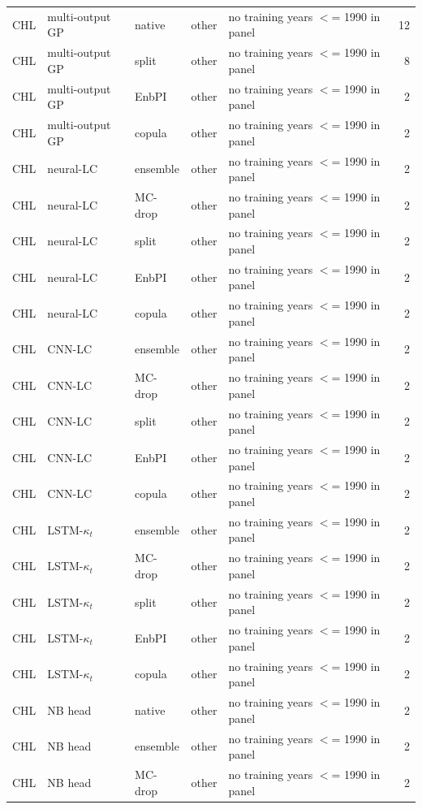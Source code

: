 {\begin{longtable}{@{}lllp{1.6cm}p{6.2cm}r@{}}
CHL & multi-output GP & native & other & no training years $<$= 1990 in panel & 12 \\
CHL & multi-output GP & split & other & no training years $<$= 1990 in panel & 8 \\
CHL & multi-output GP & EnbPI & other & no training years $<$= 1990 in panel & 2 \\
CHL & multi-output GP & copula & other & no training years $<$= 1990 in panel & 2 \\
CHL & neural-LC & ensemble & other & no training years $<$= 1990 in panel & 2 \\
CHL & neural-LC & MC-drop & other & no training years $<$= 1990 in panel & 2 \\
CHL & neural-LC & split & other & no training years $<$= 1990 in panel & 2 \\
CHL & neural-LC & EnbPI & other & no training years $<$= 1990 in panel & 2 \\
CHL & neural-LC & copula & other & no training years $<$= 1990 in panel & 2 \\
CHL & CNN-LC & ensemble & other & no training years $<$= 1990 in panel & 2 \\
CHL & CNN-LC & MC-drop & other & no training years $<$= 1990 in panel & 2 \\
CHL & CNN-LC & split & other & no training years $<$= 1990 in panel & 2 \\
CHL & CNN-LC & EnbPI & other & no training years $<$= 1990 in panel & 2 \\
CHL & CNN-LC & copula & other & no training years $<$= 1990 in panel & 2 \\
CHL & LSTM-$\kappa_t$ & ensemble & other & no training years $<$= 1990 in panel & 2 \\
CHL & LSTM-$\kappa_t$ & MC-drop & other & no training years $<$= 1990 in panel & 2 \\
CHL & LSTM-$\kappa_t$ & split & other & no training years $<$= 1990 in panel & 2 \\
CHL & LSTM-$\kappa_t$ & EnbPI & other & no training years $<$= 1990 in panel & 2 \\
CHL & LSTM-$\kappa_t$ & copula & other & no training years $<$= 1990 in panel & 2 \\
CHL & NB head & native & other & no training years $<$= 1990 in panel & 2 \\
CHL & NB head & ensemble & other & no training years $<$= 1990 in panel & 2 \\
CHL & NB head & MC-drop & other & no training years $<$= 1990 in panel & 2 \\

\end{longtable}}
